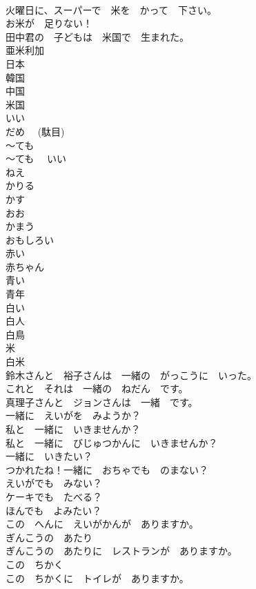\documentclass[8pt]{extreport}
\begin{document}
\begin{CJK}{UTF8}{min}
\\	火曜日に、スーパーで　米を　かって　下さい。	
\\	お米が　足りない！	
\\	田中君の　子どもは　米国で　生まれた。	
\\	亜米利加	
\\	日本	
\\	韓国	
\\	中国	
\\	米国	
\\	いい	
\\	だめ　 (駄目)	
\\	～ても	
\\	～ても　 いい	
\\	ねえ	
\\	かりる	
\\	かす	
\\	おお	
\\	かまう	
\\	おもしろい	
\\	赤い	
\\	赤ちゃん	
\\	青い	
\\	青年	
\\	白い	
\\	白人	
\\	白鳥	
\\	米	
\\	白米	
\\	鈴木さんと　裕子さんは　一緒の　がっこうに　いった。	
\\	これと　それは　一緒の　ねだん　です。	
\\	真理子さんと　ジョンさんは　一緒　です。	
\\	一緒に　えいがを　みようか？	
\\	私と　一緒に　いきませんか？	
\\	私と　一緒に　びじゅつかんに　いきませんか？	
\\	一緒に　いきたい？	
\\	つかれたね！一緒に　おちゃでも　のまない？	
\\	えいがでも　みない？	
\\	ケーキでも　たべる？	
\\	ほんでも　よみたい？	
\\	この　へんに　えいがかんが　ありますか。	
\\	ぎんこうの　あたり	
\\	ぎんこうの　あたりに　レストランが　ありますか。	
\\	この　ちかく	
\\	この　ちかくに　トイレが　ありますか。	

\end{CJK}
\end{document}
